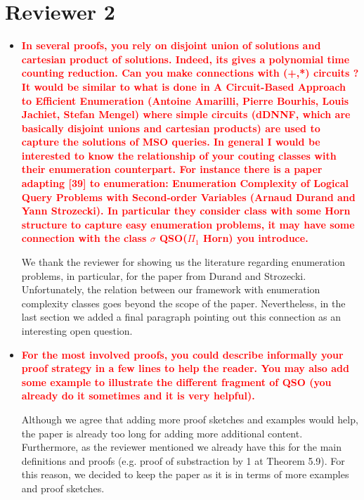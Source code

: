 \documentclass[a4paper]{article}
\newcommand{\red}[1]{{\bf\textcolor{red}{#1}}}
\begin{document}
\bigskip

\section*{Reviewer 2}

\begin{itemize}
	\setlength\itemsep{0.5em}
	\item \red{In several proofs, you rely on disjoint union of solutions and cartesian product of solutions. Indeed, its gives a polynomial time counting reduction. Can you make connections with (+,*) circuits ? It would be similar to what is done in A Circuit-Based Approach to Efficient Enumeration (Antoine Amarilli, Pierre Bourhis, Louis Jachiet, Stefan Mengel) where simple circuits (dDNNF, which are basically disjoint unions and cartesian products) are used to capture the solutions of MSO queries. In general I would be interested to know the relationship of your couting classes with their enumeration counterpart. 
	For instance there is a paper adapting [39] to enumeration: Enumeration Complexity of Logical Query Problems with Second-order Variables (Arnaud Durand and Yann Strozecki). In particular they consider class with some Horn structure to capture easy enumeration problems, it may have some connection with the class $\sigma$ QSO($\Pi_1$ Horn) you introduce.}

	We thank the reviewer for showing us the literature regarding enumeration problems, in particular, for the paper from Durand and Strozecki. Unfortunately, the relation between our framework with enumeration complexity classes goes beyond the scope of the paper. Nevertheless, in the last section we added a final paragraph pointing out this connection as an interesting open question. 
	
	\item \red{For the most involved proofs, you could describe informally your proof strategy in a few lines to help the reader. You may also add some example to illustrate the different fragment of QSO (you already do it sometimes and it is very helpful).}
	
	Although we agree that adding more proof sketches and examples would help, the paper is already too long for adding more additional content. Furthermore, as the reviewer mentioned we already have this for the main definitions and proofs (e.g. proof of substraction by 1 at Theorem 5.9). For this reason, we decided to keep the paper as it is in terms of more examples and proof sketches. 
	

\end{itemize}
\end{document}
